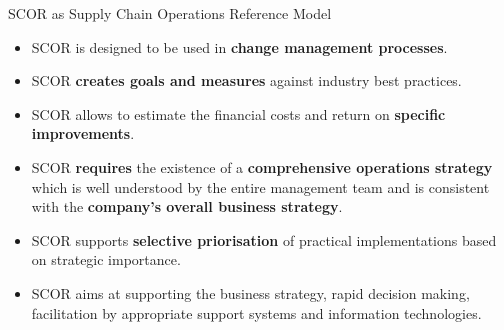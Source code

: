 \documentclass{beamer}
\begin{document}
\begin{frame}{SCOR as Supply Chain Operations Reference Model}

\begin{itemize}
\item SCOR is designed to be used in \textbf{change management processes}.
\item SCOR \textbf{creates goals and measures} against industry best
  practices.
\item SCOR allows to estimate the financial costs and return on
  \textbf{specific improvements}.
\item SCOR \textbf{requires} the existence of a \textbf{comprehensive
  operations strategy} which is well understood by the entire management team
  and is consistent with the \textbf{company's overall business strategy}.
\item SCOR supports \textbf{selective priorisation} of practical
  implementations based on strategic importance.
\item SCOR aims at supporting the business strategy, rapid decision making,
  facilitation by appropriate support systems and information technologies.  
\end{itemize}
  
\end{frame}
\end{document}
